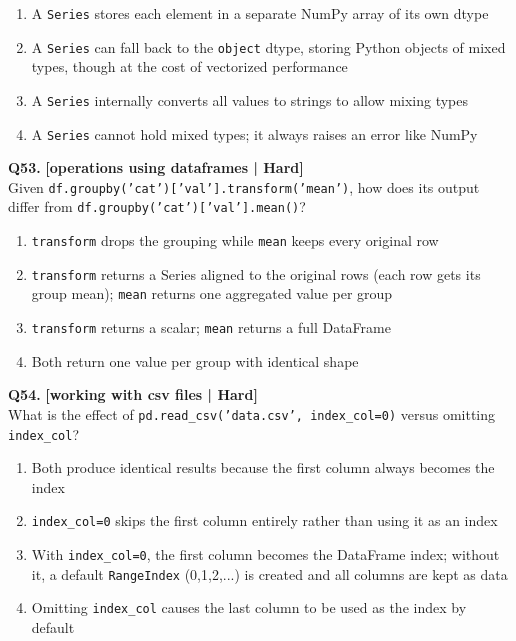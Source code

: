 \begin{enumerate}[label=(\alph*),topsep=2pt,itemsep=1pt,partopsep=0pt,parsep=0pt]
    \item \relax A \texttt{Series} stores each element in a separate NumPy array of its own dtype
    \item \relax A \texttt{Series} can fall back to the \texttt{object} dtype, storing Python objects of mixed types, though at the cost of vectorized performance
    \item \relax A \texttt{Series} internally converts all values to strings to allow mixing types
    \item \relax A \texttt{Series} cannot hold mixed types; it always raises an error like NumPy
\end{enumerate}
\vspace{2mm}

\noindent\textbf{Q53.} \hfill {\small\color{LPUOrange}\textbf{[operations using dataframes | Hard]}}\\[2pt]
Given \texttt{df.groupby('cat')['val'].transform('mean')}, how does its output differ from \texttt{df.groupby('cat')['val'].mean()}?

\begin{enumerate}[label=(\alph*),topsep=2pt,itemsep=1pt,partopsep=0pt,parsep=0pt]
    \item \relax \texttt{transform} drops the grouping while \texttt{mean} keeps every original row
    \item \relax \texttt{transform} returns a Series aligned to the original rows (each row gets its group mean); \texttt{mean} returns one aggregated value per group
    \item \relax \texttt{transform} returns a scalar; \texttt{mean} returns a full DataFrame
    \item \relax Both return one value per group with identical shape
\end{enumerate}
\vspace{2mm}

\noindent\textbf{Q54.} \hfill {\small\color{LPUOrange}\textbf{[working with csv files | Hard]}}\\[2pt]
What is the effect of \texttt{pd.read\_csv('data.csv', index\_col=0)} versus omitting \texttt{index\_col}?

\begin{enumerate}[label=(\alph*),topsep=2pt,itemsep=1pt,partopsep=0pt,parsep=0pt]
    \item \relax Both produce identical results because the first column always becomes the index
    \item \relax \texttt{index\_col=0} skips the first column entirely rather than using it as an index
    \item \relax With \texttt{index\_col=0}, the first column becomes the DataFrame index; without it, a default \texttt{RangeIndex} (0,1,2,...) is created and all columns are kept as data
    \item \relax Omitting \texttt{index\_col} causes the last column to be used as the index by default
\end{enumerate}
\vspace{2mm}

